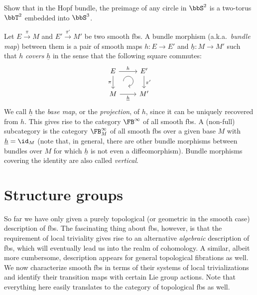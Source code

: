 \begin{xca}
    Show that in the Hopf bundle, the preimage of any circle in $\bbS^2$ is a two-torus $\bbT^2$ embedded into $\bbS^3$.
\end{xca}


\begin{defn}
    Let $E\overset{\pi}{\to}M$ and $E'\overset{\pi'}{\to}M'$ be two smooth \glspl{fb}. A bundle morphism (a.k.a.\ \emph{bundle map}) between them is a pair of smooth maps $h:E\to E'$ and $\underline{h}:M\to M'$ such that $h$ \emph{covers} $\underline{h}$ in the sense that the following square commutes:
    \[\begin{tikzcd}[every matrix/.append style={name=m},   
    execute at end picture={\draw [<-] ([xshift=-8mm,yshift=1mm]m-2-2.north) arc[start angle=-90,delta angle=270,radius=0.25cm];}]
       E \arrow[r,"h"]\arrow[d,swap,"\pi"]& E'\arrow[d,"\pi'"] \\
       M\arrow[r,swap,"\underline{h}"]& M'
    \end{tikzcd}\]
    We call $\underline{h}$ the \emph{base map}, or the \emph{projection}, of $h$, since it can be uniquely recovered from $h$.
    This gives rise to the category $\FB^\infty$ of all smooth \glspl{fb}. A (non-full) subcategory is the category $\FB^\infty_M$ of all smooth \glspl{fb} over a given base $M$ with $\underline{h}=\id_M$ (note that, in general, there are other bundle morphisms between bundles over $M$ for which $\underline{h}$ is not even a diffeomorphism). Bundle morphisms covering the identity are also called \emph{vertical}.
\end{defn}








\section{Structure groups}\label{sec: structure groups}

So far we have only given a purely topological (or geometric in the smooth case) description of \glspl{fb}. The fascinating thing about \glspl{fb}, however, is that the requirement of local triviality gives rise to an alternative \emph{algebraic} description of \glspl{fb}, which will eventually lead us into the realm of cohomology. A similar, albeit more cumbersome, description appears for general topological fibrations as well. We now characterize smooth \glspl{fb} in terms of their systems of local trivializations and identify their transition maps with certain Lie group actions. Note that everything here easily translates to the category of topological \glspl{fb} as well.


